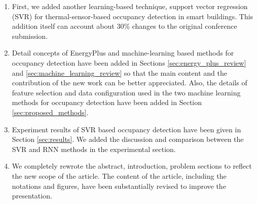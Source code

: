 \begin{enumerate}
\item First, we added another learning-based technique, support vector
  regression (SVR) for thermal-sensor-based occupancy detection in
  smart buildings. This addition itself can account about 30\% changes
  to the original conference submission.

\item Detail concepts of EnergyPlus and machine-learning based methods
  for occupancy detection have been added in Sections
  \ref{sec:energy_plus_review} and \ref{sec:machine_learning_review}
  so that the main content and the contribution of the new work can be
  better appreciated. Also, the details of feature selection and data
  configuration used in the two machine learning methods for occupancy
  detection have been added in Section \ref{sec:proposed_methods}.

\item Experiment results of SVR based occupancy detection have been
  given in Section \ref{sec:results}.  We added the discussion
  and comparison between the SVR and RNN methods in the experimental
  section.

\item We completely rewrote the abstract, introduction, problem
  sections to reflect the new scope of the article. The content of the
  article, including the notations and figures, have been
  substantially revised to improve the presentation.


%
%
%
%
%
%


\end{enumerate}



%
